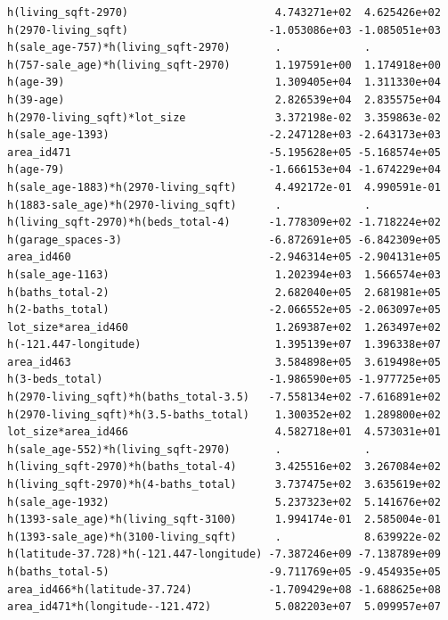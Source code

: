 \documentclass[
]{article}
\begin{document}
\begin{verbatim}
h(living_sqft-2970)                       4.743271e+02  4.625426e+02
h(2970-living_sqft)                      -1.053086e+03 -1.085051e+03
h(sale_age-757)*h(living_sqft-2970)       .             .           
h(757-sale_age)*h(living_sqft-2970)       1.197591e+00  1.174918e+00
h(age-39)                                 1.309405e+04  1.311330e+04
h(39-age)                                 2.826539e+04  2.835575e+04
h(2970-living_sqft)*lot_size              3.372198e-02  3.359863e-02
h(sale_age-1393)                         -2.247128e+03 -2.643173e+03
area_id471                               -5.195628e+05 -5.168574e+05
h(age-79)                                -1.666153e+04 -1.674229e+04
h(sale_age-1883)*h(2970-living_sqft)      4.492172e-01  4.990591e-01
h(1883-sale_age)*h(2970-living_sqft)      .             .           
h(living_sqft-2970)*h(beds_total-4)      -1.778309e+02 -1.718224e+02
h(garage_spaces-3)                       -6.872691e+05 -6.842309e+05
area_id460                               -2.946314e+05 -2.904131e+05
h(sale_age-1163)                          1.202394e+03  1.566574e+03
h(baths_total-2)                          2.682040e+05  2.681981e+05
h(2-baths_total)                         -2.066552e+05 -2.063097e+05
lot_size*area_id460                       1.269387e+02  1.263497e+02
h(-121.447-longitude)                     1.395139e+07  1.396338e+07
area_id463                                3.584898e+05  3.619498e+05
h(3-beds_total)                          -1.986590e+05 -1.977725e+05
h(2970-living_sqft)*h(baths_total-3.5)   -7.558134e+02 -7.616891e+02
h(2970-living_sqft)*h(3.5-baths_total)    1.300352e+02  1.289800e+02
lot_size*area_id466                       4.582718e+01  4.573031e+01
h(sale_age-552)*h(living_sqft-2970)       .             .           
h(living_sqft-2970)*h(baths_total-4)      3.425516e+02  3.267084e+02
h(living_sqft-2970)*h(4-baths_total)      3.737475e+02  3.635619e+02
h(sale_age-1932)                          5.237323e+02  5.141676e+02
h(1393-sale_age)*h(living_sqft-3100)      1.994174e-01  2.585004e-01
h(1393-sale_age)*h(3100-living_sqft)      .             8.639922e-02
h(latitude-37.728)*h(-121.447-longitude) -7.387246e+09 -7.138789e+09
h(baths_total-5)                         -9.711769e+05 -9.454935e+05
area_id466*h(latitude-37.724)            -1.709429e+08 -1.688625e+08
area_id471*h(longitude--121.472)          5.082203e+07  5.099957e+07
                                                                    

\end{verbatim}
\end{document}
